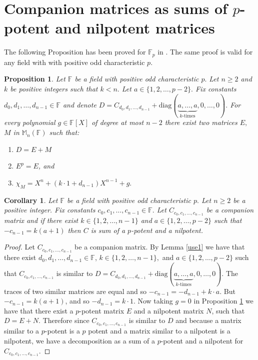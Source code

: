 \documentclass[11pt]{amsart}
\newtheorem{cor}[thm]{Corollary}
\newtheorem{prop}[thm]{Proposition}
\theoremstyle{definition}
\numberwithin{equation}{section}
\newcommand{\diag}{\mathrm{diag}}
\newcommand{\F}{\mathbb{F}}
\begin{document}
\section{Companion matrices as sums of $p$-potent and nilpotent matrices}
The following Proposition has been proved for $\F_p$ in \cite{Pojar}. The same proof is valid for any field with with positive odd characteristic $p.$

\begin{prop}\label{PrescrDecomp}
Let $\F$ be a field with positive odd characteristic $p.$
Let $n\geq 2$ and $k$ be positive integers such that $k<n.$ Let $a\in \{1,2,\dots,p-2\}.$ Fix constants $d_0, d_1,\dots,d_{n-1}\in \F$ and denote $D=C_{d_0,d_1,\ldots,d_{n-1}}+\diag (\underbrace{a,\dots,a }_{k \textrm{-times}}  ,0,\dots,0).$ For every polynomial $g\in \F[X]$ of degree at most $n-2$ there exist two matrices $E,$ $M$ in $\mathbb{M}_n(\F)$ such that:
\begin{enumerate}
\item $D=E+M$
\item $E^p=E$, and
\item $\chi_M=X^n+(k\cdot 1+d_{n-1})X^{n-1}+g.$
\end{enumerate}
\end{prop}

\begin{cor}\label{corPrescrDecomp}
Let $\F$ be a field with positive odd characteristic $p.$ Let $n\geq 2$ be a positive integer. Fix constants $c_0, c_1,\dots,c_{n-1}\in \F.$
Let $C_{c_0,c_1,\ldots,c_{n-1}}$ be a companion matrix and if there exist $k\in \{1,2,\ldots,n-1\}$ and $a\in \{1,2,\ldots,p-2\}$ such that $-c_{n-1}=k(a+1)$ then  $C$ is sum of a $p$-potent and a nilpotent.
\end{cor}
\begin{proof}
Let $C_{c_0,c_1,\ldots,c_{n-1}}$ be a companion matrix. By Lemma \ref{use1} we have that there exist  $d_0, d_1,\dots,d_{n-1}\in \F$, $k\in \{1,2,\ldots,n-1\},$ and $a\in \{1,2,\ldots,p-2\}$ such that $C_{c_0,c_1,\ldots,c_{n-1}}$ is similar to $D=C_{d_0,d_1,\ldots,d_{n-1}}+\diag (\underbrace{a,\dots,a }_{k \textrm{-times}}  ,0,\dots,0)$. The traces of two similar matrices are equal and so $-c_{n-1}=-d_{n-1}+k\cdot a$. But $-c_{n-1}=k(a+1)$, and so $-d_{n-1}=k\cdot 1.$ Now taking $g=0$ in Proposition \ref{PrescrDecomp} we have that there exist a $p$-potent matrix $E$ and a nilpotent matrix $N$, such that $D=E+N$. Therefore since $C_{c_0,c_1,\ldots,c_{n-1}}$ is similar to $D$ and because a matrix similar to a $p$-potent is a $p$ potent and a matrix similar to a nilpotent is a nilpotent, we have a decomposition as a sum of a $p$-potent and a nilpotent for $C_{c_0,c_1,\ldots,c_{n-1}}.$
\end{proof}
\end{document}
